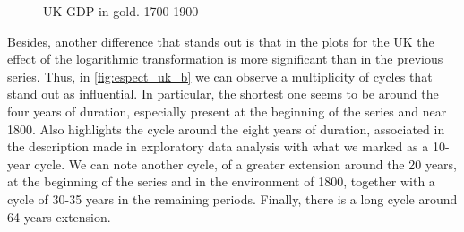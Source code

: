 \documentclass[a4paper,10cpi]{article}
\begin{document}
	\begin{figure}[H]
		\centering
		\caption{UK GDP in gold. 1700-1900} \label{fig:espect_uk}
	\end{figure}
	
	Besides, another difference that stands out is that in the plots for the UK the effect of the logarithmic transformation is more significant than in the previous series. Thus, in \ref {fig:espect_uk_b} we can observe a multiplicity of cycles that stand out as influential. In particular, the shortest one seems to be around the four years of duration, especially present at the beginning of the series and near 1800. Also highlights the cycle around the eight years of duration, associated in the description made in exploratory data analysis with what we marked as a 10-year cycle. We can note another cycle, of a greater extension around the 20 years, at the beginning of the series and in the environment of 1800, together with a cycle of 30-35 years in the remaining periods. Finally, there is a long cycle around 64 years extension.
	
\end{document}
